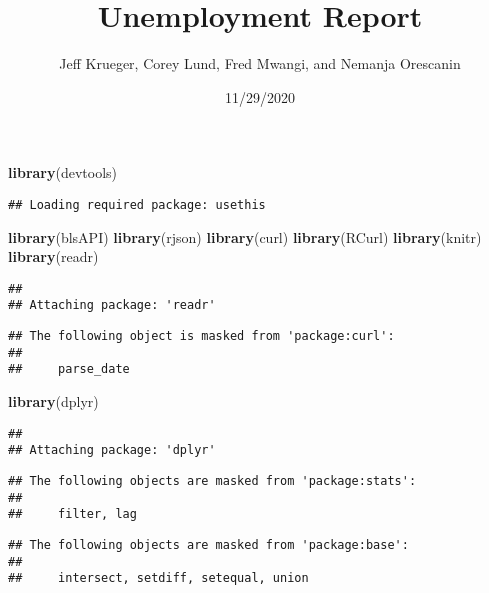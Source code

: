 \documentclass[
]{article}
\title{Unemployment Report}
\author{Jeff Krueger, Corey Lund, Fred Mwangi, and Nemanja Orescanin}
\date{11/29/2020}
\newenvironment{Shaded}{\begin{snugshade}}{\end{snugshade}}
\newcommand{\KeywordTok}[1]{\textcolor[rgb]{0.13,0.29,0.53}{\textbf{#1}}}
\newcommand{\NormalTok}[1]{#1}
\begin{document}
\maketitle

\begin{Shaded}
\begin{Highlighting}[]
\KeywordTok{library}\NormalTok{(devtools)}
\end{Highlighting}
\end{Shaded}

\begin{verbatim}
## Loading required package: usethis
\end{verbatim}

\begin{Shaded}
\begin{Highlighting}[]
\KeywordTok{library}\NormalTok{(blsAPI)}
\KeywordTok{library}\NormalTok{(rjson)}
\KeywordTok{library}\NormalTok{(curl)}
\KeywordTok{library}\NormalTok{(RCurl)}
\KeywordTok{library}\NormalTok{(knitr)}
\KeywordTok{library}\NormalTok{(readr)}
\end{Highlighting}
\end{Shaded}

\begin{verbatim}
## 
## Attaching package: 'readr'
\end{verbatim}

\begin{verbatim}
## The following object is masked from 'package:curl':
## 
##     parse_date
\end{verbatim}

\begin{Shaded}
\begin{Highlighting}[]
\KeywordTok{library}\NormalTok{(dplyr)}
\end{Highlighting}
\end{Shaded}

\begin{verbatim}
## 
## Attaching package: 'dplyr'
\end{verbatim}

\begin{verbatim}
## The following objects are masked from 'package:stats':
## 
##     filter, lag
\end{verbatim}

\begin{verbatim}
## The following objects are masked from 'package:base':
## 
##     intersect, setdiff, setequal, union
\end{verbatim}
\end{document}
